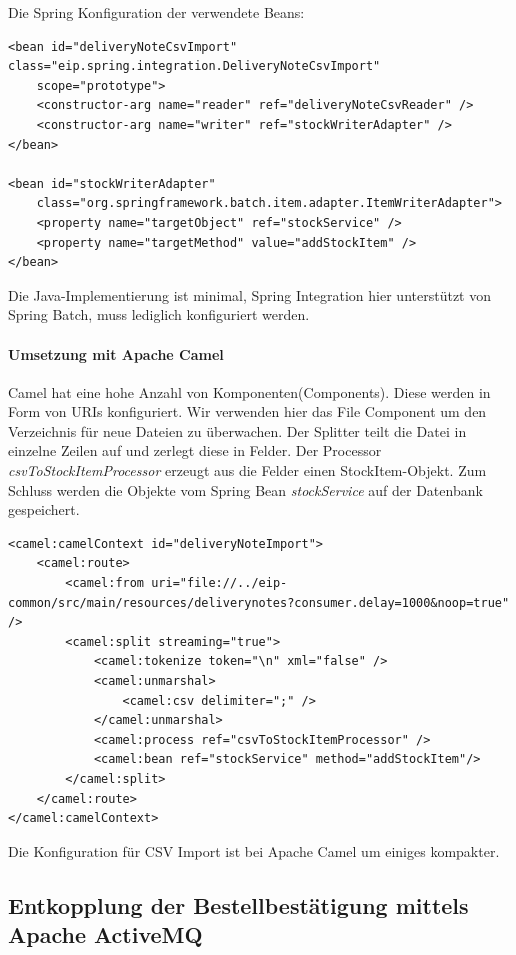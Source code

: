 \documentclass[12pt,a4paper,ngerman]{article}
\begin{document}
Die Spring Konfiguration der verwendete Beans:

\begin{lstlisting}
<bean id="deliveryNoteCsvImport" class="eip.spring.integration.DeliveryNoteCsvImport"
    scope="prototype">
    <constructor-arg name="reader" ref="deliveryNoteCsvReader" />
    <constructor-arg name="writer" ref="stockWriterAdapter" />
</bean>

<bean id="stockWriterAdapter"
    class="org.springframework.batch.item.adapter.ItemWriterAdapter">
    <property name="targetObject" ref="stockService" />
    <property name="targetMethod" value="addStockItem" />
</bean>
\end{lstlisting}

Die Java-Implementierung ist minimal, Spring Integration hier
unterstützt von Spring Batch, muss lediglich konfiguriert werden.

\paragraph{Umsetzung mit Apache Camel}

Camel hat eine hohe Anzahl von Komponenten(Components). Diese werden in
Form von URIs konfiguriert. Wir verwenden hier das File Component um den
Verzeichnis für neue Dateien zu überwachen. Der Splitter teilt die Datei
in einzelne Zeilen auf und zerlegt diese in Felder. Der Processor
\emph{csvToStockItemProcessor} erzeugt aus die Felder einen
StockItem-Objekt. Zum Schluss werden die Objekte vom Spring Bean
\emph{stockService} auf der Datenbank gespeichert.

\begin{lstlisting}
<camel:camelContext id="deliveryNoteImport">
    <camel:route>
        <camel:from uri="file://../eip-common/src/main/resources/deliverynotes?consumer.delay=1000&noop=true" />
        <camel:split streaming="true">
            <camel:tokenize token="\n" xml="false" />
            <camel:unmarshal>
                <camel:csv delimiter=";" />
            </camel:unmarshal>
            <camel:process ref="csvToStockItemProcessor" />
            <camel:bean ref="stockService" method="addStockItem"/>
        </camel:split>
    </camel:route>
</camel:camelContext>
\end{lstlisting}

Die Konfiguration für CSV Import ist bei Apache Camel um einiges
kompakter.

\subsection{Entkopplung der Bestellbestätigung mittels Apache
ActiveMQ}
\end{document}
